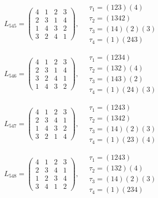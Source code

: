 $L_{545} = \begin{pmatrix} 4 & 1 & 2 & 3 \\ 2 & 3 & 1 & 4 \\ 1 & 4 & 3 & 2 \\ 3 & 2 & 4 & 1 \end{pmatrix}, \quad \begin{matrix} \tau_{1} = (1 2 3)(4) \\ \tau_{2} = (1 3 4 2) \\ \tau_{3} = (1 4)(2)(3) \\ \tau_{4} = (1)(2 4 3) \end{matrix}$

$L_{546} = \begin{pmatrix} 4 & 1 & 2 & 3 \\ 2 & 3 & 1 & 4 \\ 3 & 2 & 4 & 1 \\ 1 & 4 & 3 & 2 \end{pmatrix}, \quad \begin{matrix} \tau_{1} = (1 2 3 4) \\ \tau_{2} = (1 3 2)(4) \\ \tau_{3} = (1 4 3)(2) \\ \tau_{4} = (1)(2 4)(3) \end{matrix}$

$L_{547} = \begin{pmatrix} 4 & 1 & 2 & 3 \\ 2 & 3 & 4 & 1 \\ 1 & 4 & 3 & 2 \\ 3 & 2 & 1 & 4 \end{pmatrix}, \quad \begin{matrix} \tau_{1} = (1 2 4 3) \\ \tau_{2} = (1 3 4 2) \\ \tau_{3} = (1 4)(2)(3) \\ \tau_{4} = (1)(2 3)(4) \end{matrix}$

$L_{548} = \begin{pmatrix} 4 & 1 & 2 & 3 \\ 2 & 3 & 4 & 1 \\ 1 & 2 & 3 & 4 \\ 3 & 4 & 1 & 2 \end{pmatrix}, \quad \begin{matrix} \tau_{1} = (1 2 4 3) \\ \tau_{2} = (1 3 2)(4) \\ \tau_{3} = (1 4)(2)(3) \\ \tau_{4} = (1)(2 3 4) \end{matrix}$

